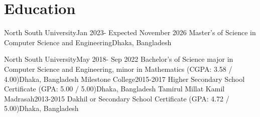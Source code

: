 \section{Education}
    \resumeSubHeadingListStart

    \resumeSubheading
    {North South University}{Jan 2023- Expected November 2026}
    {Master's of Science in Computer Science and Engineering}{Dhaka, Bangladesh}
    \resumeItemListStart
    \resumeItemListEnd
    
    \resumeSubheading
    {North South University}{May 2018- Sep 2022}
    {Bachelor's of Science major in Computer Science and Engineering, minor in Mathematics (CGPA: 3.58 / 4.00)}{Dhaka, Bangladesh}
    \resumeItemListStart
    \resumeItemListEnd
    \resumeSubheading
    {Milestone College}{2015-2017}
    {Higher Secondary School Certificate (GPA: 5.00 / 5.00)}{Dhaka, Bangladesh}
    \resumeItemListStart
    \resumeItemListEnd
    \resumeSubheading
    {Tamirul Millat Kamil Madrasah}{2013-2015}
    {Dakhil or Secondary School Certificate (GPA: 4.72 / 5.00)}{Dhaka, Bangladesh}
    \resumeItemListStart
    \resumeItemListEnd

    \resumeSubHeadingListEnd